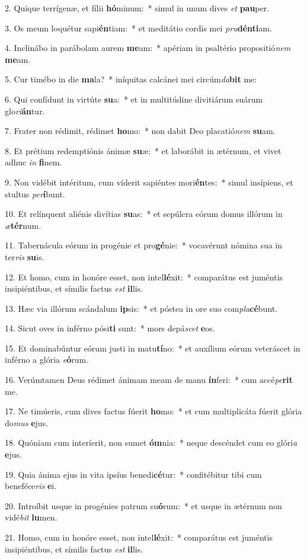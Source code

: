 2. Quique terrígenæ, et fílii \textbf{hó}minum:~*  simul in unum dives \textit{et} \textbf{pau}per.\

3. Os meum loquétur sapi\textbf{én}tiam:~*  et meditátio cordis mei \textit{pru}\textbf{dén}\textbf{ti}am.\

4. Inclinábo in parábolam aurem \textbf{me}am:~*  apériam in psaltério propositió\textit{nem} \textbf{me}am.\

5. Cur timébo in die \textbf{ma}la?~*  iníquitas calcánei mei circúm\textit{da}\textbf{bit} me:\

6. Qui confídunt in virtúte \textbf{su}a:~*  et in multitúdine divitiárum suárum glo\textit{ri}\textbf{án}tur.\

7. Frater non rédimit, rédimet \textbf{ho}mo:~*  non dabit Deo placatió\textit{nem} \textbf{su}am.\

8. Et prétium redemptiónis ánimæ \textbf{su}æ:~*  et laborábit in ætérnum, et vivet adhuc \textit{in} \textbf{fi}nem.\

9. Non vidébit intéritum, cum víderit sapiéntes mori\textbf{én}tes:~*  simul insípiens, et stultus \textit{per}\textbf{í}bunt.\

10. Et relínquent aliénis divítias \textbf{su}as:~*  et sepúlcra eórum domus illórum in \textit{æ}\textbf{tér}num.\

11. Tabernácula eórum in progénie et pro\textbf{gé}nie:~*  vocavérunt nómina sua in ter\textit{ris} \textbf{su}is.\

12. Et homo, cum in honóre esset, non intel\textbf{lé}xit:~*  comparátus est juméntis insipiéntibus, et símilis factus \textit{est} \textbf{il}lis.\

13. Hæc via illórum scándalum \textbf{ip}sis:~*  et póstea in ore suo com\textit{pla}\textbf{cé}bunt.\

14. Sicut oves in inférno pósi\textbf{ti} sunt:~*  mors depá\textit{scet} \textbf{e}os.\

15. Et dominabúntur eórum justi in matu\textbf{tí}no:~*  et auxílium eórum veteráscet in inférno a glória \textit{e}\textbf{ó}rum.\

16. Verúmtamen Deus rédimet ánimam meam de manu \textbf{ín}feri:~*  cum accé\textit{pe}\textbf{rit} me.\

17. Ne timúeris, cum dives factus fúerit \textbf{ho}mo:~*  et cum multiplicáta fúerit glória do\textit{mus} \textbf{e}jus.\

18. Quóniam cum interíerit, non sumet \textbf{óm}nia:~*  neque descéndet cum eo glóri\textit{a} \textbf{e}jus.\

19. Quia ánima ejus in vita ipsíus benedi\textbf{cé}tur:~*  confitébitur tibi cum beneféce\textit{ris} \textbf{e}i.\

20. Introíbit usque in progénies patrum su\textbf{ó}rum:~*  et usque in ætérnum non vidé\textit{bit} \textbf{lu}men.\

21. Homo, cum in honóre esset, non intel\textbf{lé}xit:~*  comparátus est juméntis insipiéntibus, et símilis factus \textit{est} \textbf{il}lis.\

